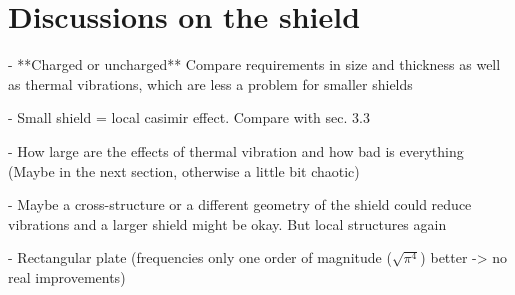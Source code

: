 \section{Discussions on the shield} \label{sec:4:discussion}

- **Charged or uncharged**
Compare requirements in size and thickness as well as thermal vibrations, which are less a problem for smaller shields

- Small shield = local casimir effect. Compare with sec. 3.3

- How large are the effects of thermal vibration and how bad is everything
(Maybe in the next section, otherwise a little bit chaotic)

- Maybe a cross-structure or a different geometry of the shield could reduce vibrations and a larger shield might be okay. But local structures again

- Rectangular plate (frequencies only one order of magnitude ($\sqrt{\pi^4}$) better -> no real improvements)